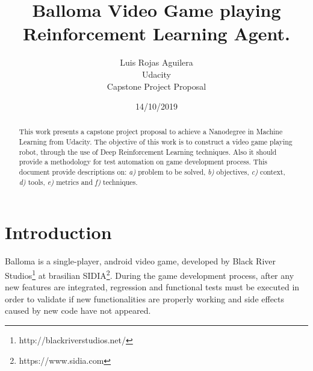 \documentclass[peerreview]{IEEEtran}
\begin{document}
\title{Balloma Video Game playing Reinforcement Learning Agent.}



\author{Luis Rojas Aguilera \\
Udacity\\
Capstone Project Proposal\\
}
\date{14/10/2019}

\maketitle
\tableofcontents
\listoffigures
\listoftables

\IEEEpeerreviewmaketitle
\begin{abstract}

  This work presents a capstone project proposal to achieve a Nanodegree in Machine Learning from Udacity. The objective of this work is to construct a video game playing robot, through the use of Deep Reinforcement Learning techniques. Also it should provide a methodology for test automation on game development process. This document provide descriptions on: \textit{a)} problem to be solved, \textit{b)} objectives, \textit{c)} context, \textit{d)} tools, \textit{e)} metrics and \textit{f)} techniques.

\end{abstract}


\section{Introduction}
Balloma is a single-player, android video game, developed by Black River Studios\footnote{http://blackriverstudios.net/} at brasilian SIDIA\footnote{https://www.sidia.com}.  During the game development process, after any new features are integrated, regression and functional tests must be executed in order to validate if new functionalities are properly working and side effects caused by new code have not appeared. 
\end{document}
